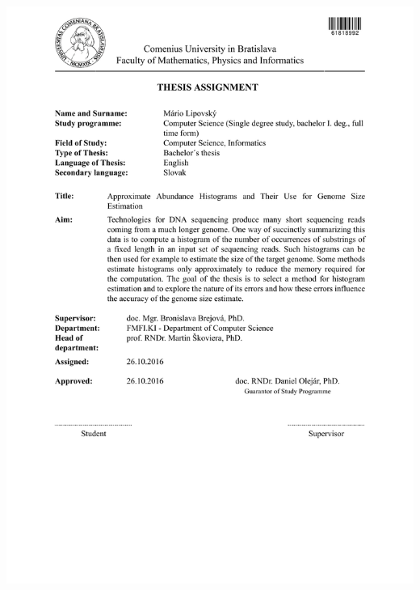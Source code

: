 \documentclass[12pt, oneside]{book}
\begin{document}
\newpage 
\thispagestyle{empty}
\hspace{-3.5cm}\includegraphics[width=1.3\textwidth]{images/zadanie-aj}
\end{document}
